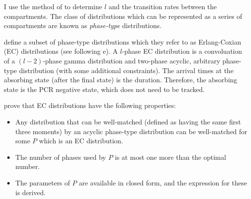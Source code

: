\documentclass[thesis.tex]{subfiles}
\begin{document}
I use the method of \textcite{osogamiClosed} to determine $l$ and the transition rates between the compartments.
The class of distributions which can be represented as a series of compartments are known as \emph{phase-type} distributions.

\Textcite{osogamiClosed} define a subset of phase-type distributions which they refer to as Erlang-Coxian (EC) distributions (see following e).
A $l$-phase EC distribution is a convoluation of a $(l-2)$-phase gamma distribution and two-phase acyclic, arbitrary phase-type distribution (with some additional constraints).
The arrival times at the absorbing state (after the final state) is the duration.
Therefore, the absorbing state is the PCR negative state, which does not need to be tracked.

\Textcite{osogamiClosed} prove that EC distributions have the following properties:
\begin{itemize}
    \item Any distribution that can be well-matched (defined as having the same first three moments) by an acyclic phase-type distribution can be well-matched for some $P$ which is an EC distribution.
    \item The number of phases used by $P$ is at most one more than the optimal number.
    \item The parameters of $P$ are available in closed form, and the expression for these is derived.
\end{itemize}
\end{document}
